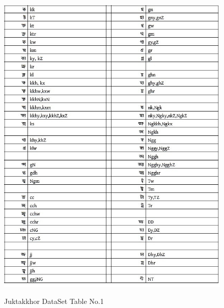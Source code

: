 \documentclass[12pt,oneside,openany,a4paper]{book}
\begin{document}
\begin{figure}
		\caption{Juktakkhor DataSet Table No.1}
		\centering
		\includegraphics[scale=0.7]{data1}
		\label{fig:data1}
\end{figure}
\end{document}

